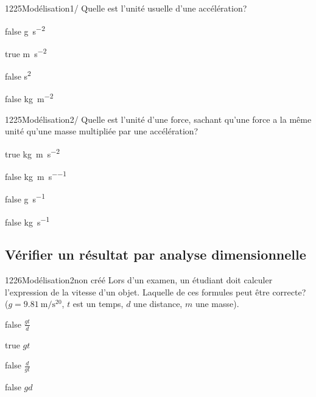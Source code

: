 \documentclass[11pt]{article}
\begin{document}
            \begin{question}{1225}{Modélisation}{1}{/}
				Quelle est l'unité usuelle d'une accélération? 
            \end{question}

            \begin{reponses}
                \item[false] \si{\gram\per\second^2}
            	\item[true] \si{\meter\per\second^2}
                \item[false] \si{\second^2}
            	\item[false] \si{\kilo\gram\per\meter^2}
            \end{reponses}
        	
            \begin{question}{1225}{Modélisation}{2}{/}
				Quelle est l'unité d'une force, sachant qu'une force a la même unité qu'une masse multipliée par une accélération?
            \end{question}

            \begin{reponses}
            	\item[true] \si{\kilo\gram.\meter\per\second^2}
            	\item[false] \si{\kilo\gram\per\meter\per\second}
                \item[false] \si{\gram\per\second}
                \item[false] \si{\kilo\gram\per\second}
            \end{reponses}
    	
        \subsection{Vérifier un résultat par analyse dimensionnelle}
        
        	\begin{question}{1226}{Modélisation}{2}{non créé}
				Lors d'un examen, un étudiant doit calculer l'expression de la vitesse d'un objet. Laquelle de ces formules peut être correcte? ($g=\SI{9,81}{\meter\per\second^20}$, $t$ est un temps, $d$ une distance, $m$ une masse).
            \end{question}

            \begin{reponses}
            	\item[false] $\frac{gt}{d}$
            	\item[true] $gt$
                \item[false] $\frac{d}{gt}$
                \item[false] $gd$
            \end{reponses}
\end{document}
